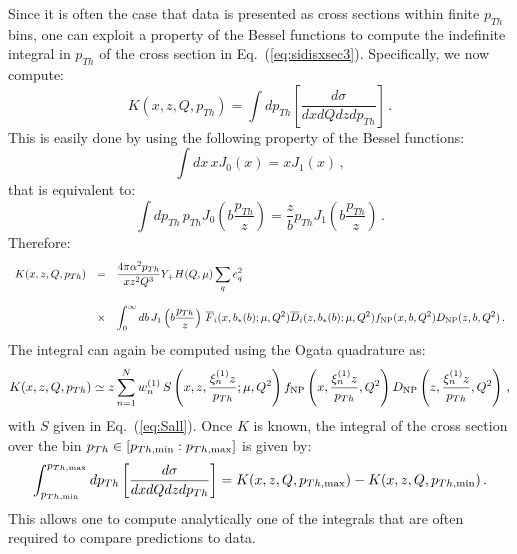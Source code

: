 \documentclass[10pt,a4paper]{article}
\begin{document}
Since it is often the case that data is presented as cross sections
within finite $p_{Th}$ bins, one can exploit a property of the Bessel
functions to compute the indefinite integral in $p_{Th}$ of the cross
section in Eq.~(\ref{eq:sidisxsec3}). Specifically, we now compute:
\begin{equation}
K(x,z,Q,p_{Th}) = \int dp_{Th}\left[\frac{d\sigma}{dxdQdz d p_{Th}}\right]\,.
\end{equation}
This is easily done by using the following property of the Bessel
functions:
\begin{equation}
\int dx\,x J_0(x) = xJ_1(x)\,,
\end{equation}
that is equivalent to:
\begin{equation}
\int dp_{Th}\,p_{Th} J_0\left(b\frac{p_{Th}}{z}\right) = \frac{z}{b}p_{Th}J_1\left(b\frac{p_{Th}}{z}\right)\,.
\end{equation}
Therefore:
\begin{equation}
\begin{array}{rcl}
\displaystyle   K(x,z,Q,p_{Th}) &=&\displaystyle
\frac{4\pi \alpha^2p_{Th}}{xz^2Q^3}Y_+ H(Q,\mu) \sum_q e_q^2\\
\\
&\times&\displaystyle 
  \int_0^\infty db\, J_1\left(b\frac{p_{Th}}{z}\right)
         \,\overline{F}_i(x,b_*(b);\mu,Q^2)
         \overline{D}_i(z,b_*(b);\mu,Q^2) f_{\rm NP}(x,b,Q^2) D_{\rm NP}(z,b,Q^2)\,.
\end{array}
\end{equation}
The integral can again be computed using the Ogata quadrature as:
\begin{equation}\label{eq:primitivepTh}
\displaystyle   K(x,z,Q,p_{Th}) \simeq \displaystyle z
  \sum_{n=1}^N w_n^{(1)}
         \,S\left(x,z,\frac{\xi_n^{(1)}z}{p_{Th}};\mu,Q^2\right) f_{\rm NP}\left(x, \frac{\xi_n^{(1)}z}{p_{Th}},Q^2\right) D_{\rm NP}\left(z, \frac{\xi_n^{(1)}z}{p_{Th}},Q^2\right)\,,
\end{equation}
with $S$ given in Eq.~(\ref{eq:Sall}). Once $K$ is known, the integral
of the cross section over the bin
$p_{Th}\in [p_{Th,\rm min}: p_{Th,\rm max}]$ is given by:
\begin{equation}
\int_{p_{Th,\rm min}}^{p_{Th,\rm max}} dp_{Th}\left[\frac{d\sigma}{dxdQdz d
    p_{Th}}\right]=K(x,z,Q,p_{Th,\rm max})-K(x,z,Q,p_{Th,\rm min})\,.
\end{equation}
This allows one to compute analytically one of the integrals that are
often required to compare predictions to data. 
\end{document}
